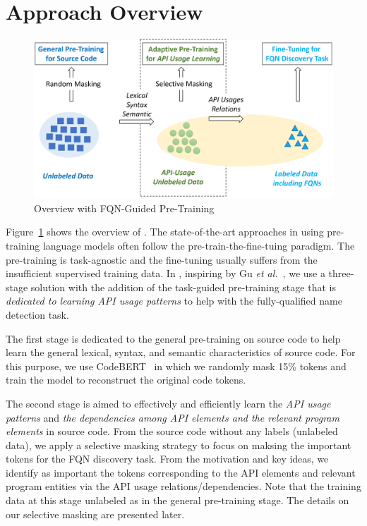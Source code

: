 \section{Approach Overview}
\label{sec:overview}

\begin{figure}[t] %
	\centering
	\includegraphics[width=\linewidth]{overview}
        \vspace{-3pt}
	\caption{{\tool} Overview with FQN-Guided Pre-Training}
	\label{fig:overview}
\end{figure}

Figure~\ref{fig:overview} shows the overview of {\tool}.  The
state-of-the-art approaches in using pre-training language models
often follow the pre-train-the-fine-tuing paradigm. The pre-training
is task-agnostic and the fine-tuning usually suffers from the
insufficient supervised training data. In {\tool}, inspiring by Gu
{\em et al.}~\cite{gu-emnlp20}, we use a three-stage solution with the
addition of the task-guided pre-training stage that is {\em dedicated
  to learning API usage patterns} to help with the fully-qualified
name detection task.

The first stage is dedicated to the general pre-training on source
code to help {\tool} learn the general lexical, syntax, and semantic
characteristics of source code. For this purpose, we use
CodeBERT~\cite{} in which we randomly mask 15\% tokens and train the
model to reconstruct the original code tokens.

The second stage is aimed to effectively and efficiently learn the
{\em API usage patterns} and {\em the dependencies among API elements
  and the relevant program elements} in source code. From the source
code without any labels (unlabeled data), we apply a selective masking
strategy to focus on maksing the important tokens for the FQN
discovery task. From the motivation and key ideas, we identify as
important the tokens corresponding to the API elements and relevant
program entities via the API usage relations/dependencies. Note that
the training data at this stage unlabeled as in the general
pre-training stage. The details on our selective masking are presented
later.



